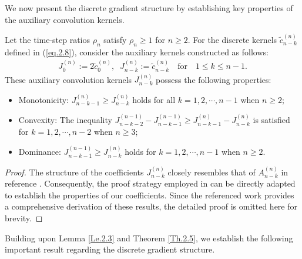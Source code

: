 \documentclass{siamart171218}
\theoremstyle{remark}
\theoremstyle{example}
\numberwithin{equation}{section}
\begin{document}
We now present the discrete gradient structure by establishing key properties of the auxiliary convolution kernels.

\begin{theorem}\label{Th.2.5}
Let the time-step ratios $\rho_n$ satisfy $\rho_n \ge 1$ for $n \ge 2$. For the discrete kernels $\widetilde{c}_{n-k}^{(n)}$ defined in (\ref{eq.2.8}), consider the auxiliary kernels constructed as follows:
\begin{align*}
J_0^{(n)} := 2\widetilde{c}_0^{(n)}, \;\;
J_{n-k}^{(n)} := \widetilde{c}_{n-k}^{(n)}\quad \text{for} \quad 1 \leq k \leq n-1.
\end{align*}
These auxiliary convolution kernels $J_{n-k}^{(n)}$ possess the following properties:
\begin{itemize}
\item[(1)] Monotonicity: $J_{n-k-1}^{(n)} \ge J_{n-k}^{(n)}$ holds for all $k =1,2, \cdots, n-1$ when $n\ge 2$;
\item[(2)] Convexity: The inequality $J_{n-k-2}^{(n-1)}-J_{n-k-1}^{(n-1)} \ge J_{n-k-1}^{(n)}-J_{n-k}^{(n)}$ is satisfied for $k =1,2, \cdots, n-2$ when $n\ge 3$;
\item[(3)] Dominance: $J_{n-k-1}^{(n-1)} \ge J_{n-k}^{(n)}$ holds for $k =1,2, \cdots, n-1$ when $n\ge 2$.
\end{itemize}
\end{theorem}

\begin{proof}
The structure of the coefficients $J_{n-k}^{(n)}$ closely resembles that of $A_{n-k}^{(n)}$ in reference \cite{Liao2024}. Consequently, the proof strategy employed in \cite{Liao2024} can be directly adapted to establish the properties of our coefficients. Since the referenced work provides a comprehensive derivation of these results, the detailed proof is omitted here for brevity.
\end{proof}

Building upon Lemma \ref{Le.2.3} and Theorem \ref{Th.2.5}, we establish the following important result regarding the discrete gradient structure.
\end{document}
